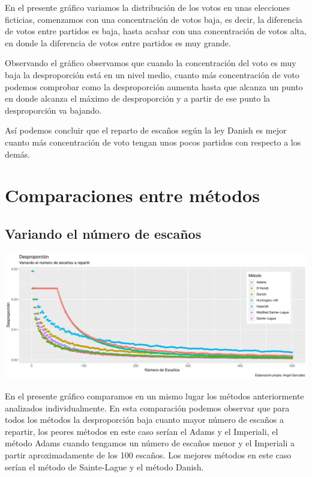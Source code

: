 \documentclass[12pt,a4paper,]{book}
\numberwithin{dummy}{section}
\theoremstyle{ocrenumbox}
\theoremstyle{blacknumex}
\theoremstyle{blacknumbox}
\theoremstyle{ocrenum}
\theoremstyle{ocrenum}
\begin{document}
En el presente gráfico variamos la distribución de los votos en unas
elecciones ficticias, comenzamos con una concentración de votos baja, es
decir, la diferencia de votos entre partidos es baja, hasta acabar con
una concentración de votos alta, en donde la diferencia de votos entre
partidos es muy grande.

Observando el gráfico observamos que cuando la concentración del voto es
muy baja la desproporción está en un nivel medio, cuanto más
concentración de voto podemos comprobar como la desproporción aumenta
hasta que alcanza un punto en donde alcanza el máximo de desproporción y
a partir de ese punto la desproporción va bajando.

Así podemos concluir que el reparto de escaños según la ley Danish es
mejor cuanto más concentración de voto tengan unos pocos partidos con
respecto a los demás.

\hypertarget{comparaciones-entre-muxe9todos}{%
\section{Comparaciones entre
métodos}\label{comparaciones-entre-muxe9todos}}

\hypertarget{variando-el-nuxfamero-de-escauxf1os}{%
\subsection{Variando el número de
escaños}\label{variando-el-nuxfamero-de-escauxf1os}}

\begin{center}\includegraphics[width=0.95\linewidth]{figurasR/unnamed-chunk-42-1} \end{center}

En el presente gráfico comparamos en un mismo lugar los métodos
anteriormente analizados individualmente. En esta comparación podemos
observar que para todos los métodos la desproporción baja cuanto mayor
número de escaños a repartir, los peores métodos en este caso serían el
Adams y el Imperiali, el método Adams cuando tengamos un número de
escaños menor y el Imperiali a partir aproximadamente de los 100
escaños. Los mejores métodos en este caso serían el método de
Sainte-Lague y el método Danish.
\end{document}

